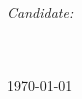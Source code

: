 \begin{titlepage}
\begin{center}
\begin{minipage}[t]{0.4\textwidth}
\begin{flushright}
                \hfill

                \emph{Candidate:}\\[0.05cm]
                \authorname\\[0.1cm] %
            \end{flushright}
        \end{minipage}\\[1cm]

        {\large \monthyeardate\today}\\[4cm] %
        
    \end{center}
\end{titlepage}